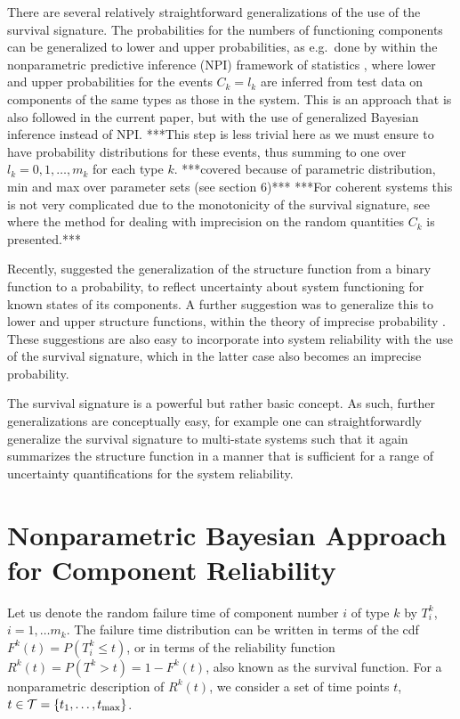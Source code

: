 \documentclass[12pt, a4paper]{elsarticle}
\def\tmax{t_\text{max}}
\newcommand{\td}[1]{%
  \iftoggle{td}{%
    \todo[inline]{#1}%
  }{}%
}
\begin{document}
There are several relatively straightforward generalizations of the use of the survival signature.
The probabilities for the numbers of functioning components can be generalized to lower and upper probabilities,
as e.g.\ done by \citet{CCMA14} within the nonparametric predictive inference (NPI) framework of statistics \citep{Co11},
where lower and upper probabilities for the events $C_k = l_k$
are inferred from test data on components of the same types as those in the system.
This is an approach that is also followed in the current paper, but with the use of generalized Bayesian inference instead of NPI.
***This step is less trivial here as we must ensure to have probability distributions for these events,
thus summing to one over $l_k=0,1,\ldots,m_k$ for each type $k$.
***covered because of parametric distribution, min and max over parameter sets (see section 6)***
***For coherent systems this is not very complicated due to the monotonicity of the survival signature,
see \citet{CCMA14} where the method for dealing with imprecision on the random quantities $C_k$ is presented.***
\td{Leave out the sentences framed with `***'?}
Recently, \citet{CCM16} suggested the generalization of the structure function from a binary function to a probability,
to reflect uncertainty about system functioning for known states of its components.
A further suggestion was to generalize this to lower and upper structure functions,
within the theory of imprecise probability \citep{itip,CU11}.
These suggestions are also easy to incorporate into system reliability with the use of the survival signature,
which in the latter case also becomes an imprecise probability.  

The survival signature is a powerful but rather basic concept.
As such, further generalizations are conceptually easy,
for example one can straightforwardly generalize the survival signature to multi-state systems
such that it again summarizes the structure function
in a manner that is sufficient for a range of uncertainty quantifications for the system reliability. 


\section{Nonparametric Bayesian Approach for Component Reliability}
\label{sec:nonparamapproach}

Let us denote the random failure time of component number $i$ of type $k$ by $T^k_i$, $i = 1, \ldots m_k$.
The failure time distribution can be written in terms of the cdf $F^k(t) = P(T^k_i \le t)$,
or in terms of the reliability function $R^k(t) = P(T^k > t) = 1 - F^k(t)$,
also known as the survival function.
For a nonparametric description of $R^k(t)$,
we consider a set of time points $t$, $t \in {\cal T} = \{t_1, \ldots, \tmax\}$.
\end{document}

